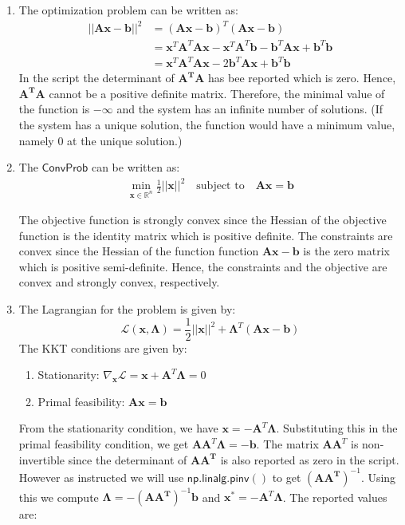 \documentclass[12pt,a4paper]{article}
\newcommand{\R}{\mathbb{R}}
\theoremstyle{remark}
\begin{document}
\begin{enumerate}
    \item The optimization problem can be written as:
    \begin{align*}
        ||\mathbf{Ax - b}||^2 &= (\mathbf{Ax - b})^T (\mathbf{Ax - b})\\
        &= \mathbf{x}^T \mathbf{A}^T \mathbf{Ax} - \mathbf{x}^T \mathbf{A}^T \mathbf{b} - \mathbf{b}^T \mathbf{A} \mathbf{x} + \mathbf{b}^T \mathbf{b}\\
        &= \mathbf{x}^T \mathbf{A}^T \mathbf{Ax} - 2 \mathbf{b}^T \mathbf{A} \mathbf{x} + \mathbf{b}^T \mathbf{b}
    \end{align*}
    In the script the determinant of $\mathbf{A^TA}$ has bee reported which is zero. Hence, $\mathbf{A^TA}$ cannot be a positive definite matrix. Therefore, the minimal value of the function is $-\infty$ and the system has an infinite number of solutions. (If the system has a unique solution, the function would have a minimum value, namely $0$ at the unique solution.)

    \item The $\mathsf{ConvProb}$ can be written as:
    \begin{align*}
        \min_{\mathbf{x} \in \R^n} \frac{1}{2} ||\mathbf{x}||^2 \quad \text{subject to} \quad \mathbf{Ax = b}
    \end{align*}

    The objective function is strongly convex since the Hessian of the objective function is the identity matrix which is positive definite. The constraints are convex since the Hessian of the function function $\mathbf{Ax - b}$ is the zero matrix which is positive semi-definite. Hence, the constraints and the objective are convex and strongly convex, respectively.

    \item The Lagrangian for the problem is given by:
    \[
        \mathcal{L}(\mathbf{x}, \mathbf{\Lambda}) = \frac{1}{2} ||\mathbf{x}||^2 + \mathbf{\Lambda}^T (\mathbf{Ax - b})
    \]
    The KKT conditions are given by:
    \begin{enumerate}
        \item Stationarity: \(\nabla_{\mathbf{x}} \mathcal{L} = \mathbf{x} + \mathbf{A}^T \mathbf{\Lambda} = 0\)
        \item Primal feasibility: \(\mathbf{Ax} = \mathbf{b}\)
    \end{enumerate}
    From the stationarity condition, we have \(\mathbf{x} = -\mathbf{A}^T \mathbf{\Lambda}\). Substituting this in the primal feasibility condition, we get \(\mathbf{AA}^T \mathbf{\Lambda} = -\mathbf{b}\). The matrix $\mathbf{AA}^T$ is non-invertible since the determinant of $\mathbf{AA^T}$ is also reported as zero in the script. However as instructed we will use $\mathsf{np.linalg.pinv()}$ to get $(\mathbf{AA^T})^{-1}$. Using this we compute $\mathbf{\Lambda} = -(\mathbf{AA^T})^{-1} \mathbf{b}$ and $\mathbf{x}^* = -\mathbf{A}^T \mathbf{\Lambda}$. The reported values are:


\end{enumerate}
\end{document}
